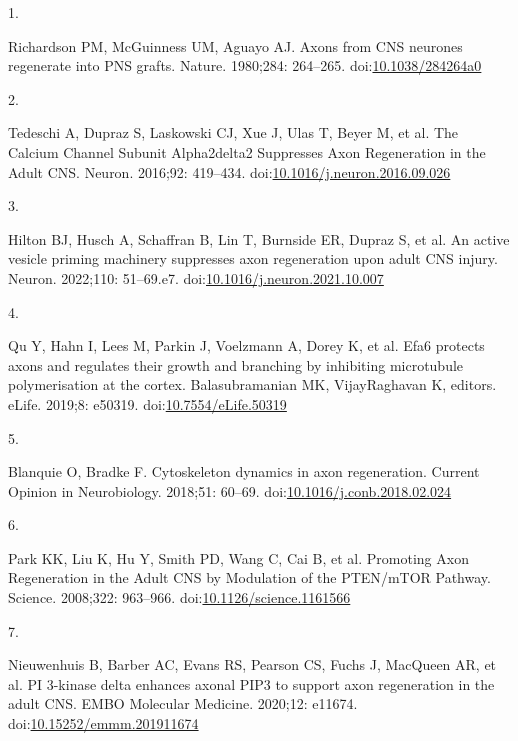 \documentclass[
  12pt,
  a4paper,
]{book}
\newlength{\cslhangindent}
\newlength{\csllabelwidth}
\newlength{\cslentryspacingunit} %
\newenvironment{CSLReferences}[2] %
 {%
  \setlength{\parindent}{0pt}
  \ifodd #1
  \let\oldpar\par
  \def\par{\hangindent=\cslhangindent\oldpar}
  \fi
  \setlength{\parskip}{#2\cslentryspacingunit}
 }%
 {}
\newcommand{\CSLLeftMargin}[1]{\parbox[t]{\csllabelwidth}{#1}}
\newcommand{\CSLRightInline}[1]{\parbox[t]{\linewidth - \csllabelwidth}{#1}\break}
\begin{document}
\hypertarget{refs}{}
\begin{CSLReferences}{0}{0}
\leavevmode{}%
\CSLLeftMargin{1. }%
\CSLRightInline{Richardson PM, McGuinness UM, Aguayo AJ. Axons from {CNS} neurones regenerate into {PNS} grafts. Nature. 1980;284: 264--265. doi:\href{https://doi.org/10.1038/284264a0}{10.1038/284264a0}}

\leavevmode{}%
\CSLLeftMargin{2. }%
\CSLRightInline{Tedeschi A, Dupraz S, Laskowski CJ, Xue J, Ulas T, Beyer M, et al. The {Calcium Channel Subunit Alpha2delta2 Suppresses Axon Regeneration} in the {Adult CNS}. Neuron. 2016;92: 419--434. doi:\href{https://doi.org/10.1016/j.neuron.2016.09.026}{10.1016/j.neuron.2016.09.026}}

\leavevmode{}%
\CSLLeftMargin{3. }%
\CSLRightInline{Hilton BJ, Husch A, Schaffran B, Lin T, Burnside ER, Dupraz S, et al. An active vesicle priming machinery suppresses axon regeneration upon adult {CNS} injury. Neuron. 2022;110: 51--69.e7. doi:\href{https://doi.org/10.1016/j.neuron.2021.10.007}{10.1016/j.neuron.2021.10.007}}

\leavevmode{}%
\CSLLeftMargin{4. }%
\CSLRightInline{Qu Y, Hahn I, Lees M, Parkin J, Voelzmann A, Dorey K, et al. Efa6 protects axons and regulates their growth and branching by inhibiting microtubule polymerisation at the cortex. Balasubramanian MK, VijayRaghavan K, editors. eLife. 2019;8: e50319. doi:\href{https://doi.org/10.7554/eLife.50319}{10.7554/eLife.50319}}

\leavevmode{}%
\CSLLeftMargin{5. }%
\CSLRightInline{Blanquie O, Bradke F. Cytoskeleton dynamics in axon regeneration. Current Opinion in Neurobiology. 2018;51: 60--69. doi:\href{https://doi.org/10.1016/j.conb.2018.02.024}{10.1016/j.conb.2018.02.024}}

\leavevmode{}%
\CSLLeftMargin{6. }%
\CSLRightInline{Park KK, Liu K, Hu Y, Smith PD, Wang C, Cai B, et al. Promoting {Axon Regeneration} in the {Adult CNS} by {Modulation} of the {PTEN}/{mTOR Pathway}. Science. 2008;322: 963--966. doi:\href{https://doi.org/10.1126/science.1161566}{10.1126/science.1161566}}

\leavevmode{}%
\CSLLeftMargin{7. }%
\CSLRightInline{Nieuwenhuis B, Barber AC, Evans RS, Pearson CS, Fuchs J, MacQueen AR, et al. {PI} 3-kinase delta enhances axonal {PIP3} to support axon regeneration in the adult {CNS}. EMBO Molecular Medicine. 2020;12: e11674. doi:\href{https://doi.org/10.15252/emmm.201911674}{10.15252/emmm.201911674}}


\end{CSLReferences}
\end{document}
